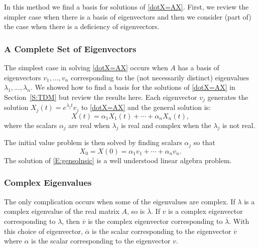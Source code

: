 \documentclass{ximera}
\begin{document}
In this method we find a basis for solutions of \eqref{dotX=AX}.  First, we 
review the simpler case when there is a basis of eigenvectors and then we 
consider (part of) the case when there is a deficiency of eigenvectors.

\subsubsection*{A Complete Set of Eigenvectors}

The simplest case in solving \eqref{dotX=AX} occurs when $A$ has a basis of 
eigenvectors $v_1,\ldots,v_n$ corresponding to the (not necessarily distinct) 
eigenvalues $\lambda_1,\ldots,\lambda_n$.  We showed how to find a basis for
the solutions of \eqref{dotX=AX} in Section~\ref{S:TDM} but review the results
here.  Each eigenvector $v_j$ generates the solution 
$X_j(t)=e^{\lambda_j t}v_j$ to \eqref{dotX=AX} and the general solution is:
\begin{equation} \label{E:gensolns}
X(t) = \alpha_1 X_1(t) + \cdots + \alpha_nX_n(t),
\end{equation}
where the scalars $\alpha_j$ are real when $\lambda_j$ is real and complex
when the $\lambda_j$ is not real.  

The initial value problem is then solved 
by finding scalars $\alpha_j$ so that
\begin{equation}  \label{E:gensolnsic}
X_0 = X(0) =\alpha_1v_1 + \cdots + \alpha_nv_n.
\end{equation}
The solution of \eqref{E:gensolnsic} is a well understood linear algebra 
problem.   

\subsubsection*{Complex Eigenvalues}

The only complication occurs when some of the eigenvalues are complex. 
If $\lambda$ is a complex eigenvalue of the real matrix $A$, so is 
$\overline{\lambda}$.  If $v$ is a complex eigenvector corresponding to 
$\lambda$, then $\overline{v}$ is the complex eigenvector corresponding to 
$\overline{\lambda}$.  With this choice of eigenvector, $\overline{\alpha}$ 
is the scalar corresponding to the eigenvector $\overline{v}$ where $\alpha$
is the scalar corresponding to the eigenvector $v$.
\end{document}
